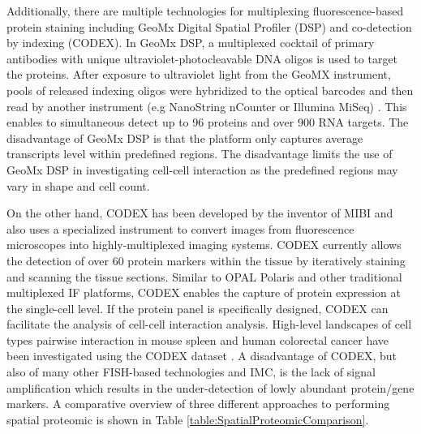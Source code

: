 Additionally, there are multiple technologies for multiplexing fluorescence-based protein staining including GeoMx Digital Spatial Profiler (DSP) and co-detection by indexing (CODEX). In GeoMx DSP, a multiplexed cocktail of primary antibodies with  unique ultraviolet-photocleavable DNA oligos is used to target the proteins. After exposure to ultraviolet light from the GeoMX instrument, pools of released indexing oligos were hybridized to the optical barcodes and then read by another instrument (e.g NanoString nCounter or Illumina MiSeq) \cite{de2020unraveling, helmink2020b}. This enables to simultaneous detect up to 96 proteins and over 900 RNA targets. The disadvantage of GeoMx DSP is that the platform only captures average transcripts level within predefined regions. The disadvantage limits the use of GeoMx DSP in investigating cell-cell interaction as the predefined regions may vary in shape and cell count. 

On the other hand, CODEX has been developed by the inventor of MIBI and also uses a specialized instrument to convert images from fluorescence microscopes into highly-multiplexed imaging systems. CODEX currently allows the detection of over 60 protein markers within the tissue by iteratively staining and scanning the tissue sections\cite{goltsev2018deep}. Similar to OPAL Polaris and other traditional multiplexed IF platforms, CODEX enables the capture of protein expression at the single-cell level. If the protein panel is specifically designed, CODEX can facilitate the analysis of cell-cell interaction analysis. High-level landscapes of cell types pairwise interaction in mouse spleen and human colorectal cancer have been investigated using the CODEX dataset \cite{schurch2020coordinated, goltsev2018CODEX}. A disadvantage of CODEX, but also of many other FISH-based technologies and IMC, is the lack of signal amplification which results in the under-detection of lowly abundant protein/gene markers. A comparative overview of three different approaches to performing spatial proteomic is shown in Table \ref{table:SpatialProteomicComparison}. 

